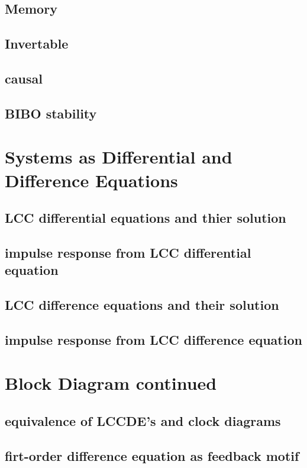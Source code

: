 \documentclass{article}
\begin{document}
\subsection{Memory}
\label{sec:org3a53807}
\subsection{Invertable}
\label{sec:orgeec0268}
\subsection{causal}
\label{sec:orgdb3dd89}
\subsection{BIBO stability}
\label{sec:org59a881d}
\section{Systems as Differential and Difference Equations}
\label{sec:orgc840576}
\subsection{LCC differential equations and thier solution}
\label{sec:org8004f54}
\subsection{impulse response from LCC differential equation}
\label{sec:org808b8e9}
\subsection{LCC difference equations and their solution}
\label{sec:org17be1e7}
\subsection{impulse response from LCC difference equation}
\label{sec:org96b828a}
\section{Block Diagram continued}
\label{sec:orgcb5c75f}
\subsection{equivalence of LCCDE's and clock diagrams}
\label{sec:org36f6bc1}
\subsection{firt-order difference equation as feedback motif}
\label{sec:orgd43ce46}
\end{document}
